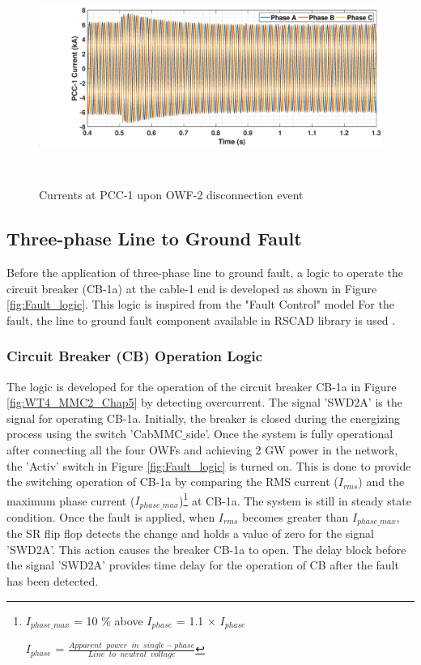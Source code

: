 \begin{figure}[H]
    \includegraphics[height = 7cm,width = \textwidth]{Diagrams/Chapter_5/IABC_WT1_WT2off.eps}
    \caption{Currents at PCC-1 upon OWF-2 disconnection event}
    \label{IABC_WT1_WT2off}
\end{figure}

\subsection{Three-phase Line to Ground Fault}

Before the application of three-phase line to ground fault, a logic to operate the circuit breaker (CB-1a) at the cable-1 end is developed as shown in Figure \ref{fig:Fault_logic}. This logic is inspired from the "Fault Control" model 
For the fault, the line to ground fault component available in RSCAD library is used \cite{rtds_tech}.

\subsubsection{Circuit Breaker (CB) Operation Logic}\label{Fault logic and cb}
The logic is developed for the operation of the circuit breaker CB-1a in Figure \ref{fig:WT4_MMC2_Chap5} by detecting overcurrent. The signal 'SWD2A' is the signal for operating CB-1a. Initially, the breaker is closed during the energizing process using the switch 'CabMMC$\_$side'. Once the system is fully operational after connecting all the four \gls{OWF}s and achieving 2 GW power in the network, the 'Activ' switch in Figure \ref{fig:Fault_logic} is turned on. This is done to provide the switching operation of CB-1a by comparing the RMS current ($I_{rms}$) and the maximum phase current ($I_{phase\_max}$)\footnote{$I_{phase\_max}$ = 10 \% above $I_{phase}$ = 1.1 $\times$ $I_{phase}$

$I_{phase}$ = $\frac{Apparent \;\; power \;\; in \;\; single-phase}{Line \;\; to \;\; neutral \;\; voltage}$} at CB-1a. The system is still in steady state condition. Once the fault is applied, when $I_{rms}$ becomes greater than $I_{phase\_max}$, the SR flip flop detects the change and holds a value of zero for the signal 'SWD2A'. This action causes the breaker CB-1a to open. The delay block before the signal 'SWD2A' provides time delay for the operation of \gls{CB} after the fault has been detected.

